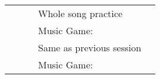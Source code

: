\begin{sidewaystable}[tbp]
\begin{tabular}{|c|c|c|l|l|}
                   &                                                                                   &                                                                                                                                     & \hspace{5mm}Whole   song practice                                                                                                                                                                            &                                                                                                                                                                      \\
                   &                                                                                   &                                                                                                                                     & Music   Game:                                                                                                                                                                                    &                                                                                                                                                                      \\
                   &                                                                                   &                                                                                                                                     & \hspace{5mm}Same as previous session                                                                                                                                                                         &                                                                                                                                                                      \\
                   &                                                                                   &                                                                                                                                     & Music   Game:                                                                                                                                                                                    &                                                                                                                                                                      \\

\end{tabular}
\end{sidewaystable}
